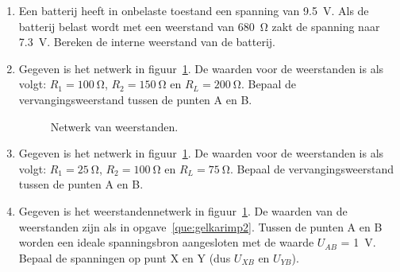 \begin{enumerate}[labelindent=0pt,labelwidth=\widthof{8.88.\ },label=\textbf{\thechapter.\arabic*.},leftmargin=!,ref=\thechapter.\arabic*]

\item
\label{que:gelinterneweerstand1}
Een batterij heeft in onbelaste toestand een spanning van \SI{9.5}{\volt}. Als de batterij belast wordt met een weerstand van \SI{680}{\ohm} zakt de spanning naar \SI{7.3}{\volt}. Bereken de interne weerstand van de batterij.


\item
\label{que:gelkarimp1}
Gegeven is het netwerk in figuur~\ref{fig:gelkarimp1}. De waarden voor de weerstanden is als volgt: $R_1 = \SI{100}{\ohm}$, $R_2 = \SI{150}{\ohm}$ en $R_L = \SI{200}{\ohm}$. Bepaal de vervangingsweerstand tussen de punten A en B.

\begin{figure}[!ht]
\centering
{}
\caption{Netwerk van weerstanden.}
\label{fig:gelkarimp1}
\end{figure}

\item
\label{que:gelkarimp2}
Gegeven is het netwerk in figuur~\ref{fig:gelkarimp1}. De waarden voor de weerstanden is als volgt: $R_1 = \SI{25}{\ohm}$, $R_2 = \SI{100}{\ohm}$ en $R_L = \SI{75}{\ohm}$. Bepaal de vervangingsweerstand tussen de punten A en B.


\item
\label{que:gelkarimp3}
Gegeven is het weerstandennetwerk in figuur~\ref{fig:gelkarimp1}. De waarden van de weerstanden zijn als in opgave~\ref{que:gelkarimp2}. Tussen de punten A en B worden een ideale spanningsbron aangesloten met de waarde $U_{AB}$ = \SI{1}{\volt}. Bepaal de spanningen op punt X en Y (dus $U_{XB}$ en $U_{YB}$).


\end{enumerate}
